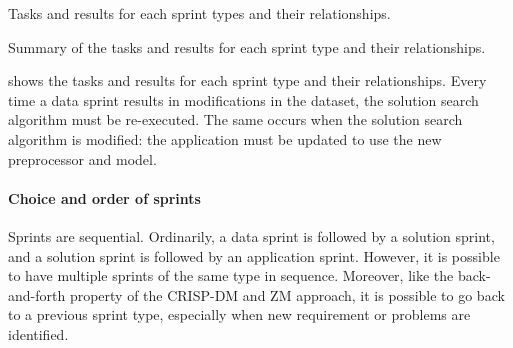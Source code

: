 \begin{figurebox}[label=fig:our-sprints]{Tasks and results for each sprint types and their relationships.}
  \tcblower
  Summary of the tasks and results for each sprint type and their relationships.
\end{figurebox}

 shows the tasks and results for each sprint type and their
relationships.  Every time a data sprint results in modifications in the dataset, the
solution search algorithm must be re-executed.  The same occurs when the solution search
algorithm is modified: the application must be updated to use the new preprocessor
and model.

\paragraph{Choice and order of sprints}

Sprints are sequential.  Ordinarily, a data sprint is followed by a solution sprint, and a
solution sprint is followed by an application sprint.  However, it is possible to have
multiple sprints of the same type in sequence.  Moreover, like the back-and-forth property of the CRISP-DM
and ZM approach, it is possible to go back to a previous sprint type, especially
when new requirement or problems are identified.

